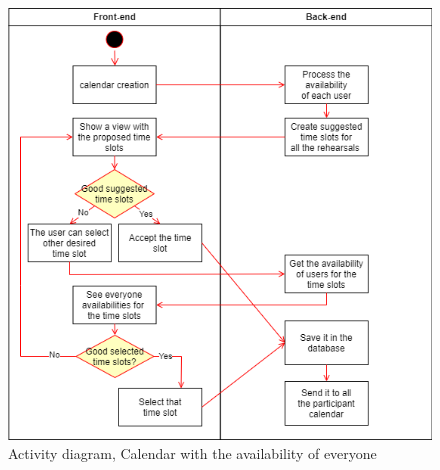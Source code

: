 \documentclass[11pt]{article}
\begin{document}
\begin{figure}[htbp!]
    \centering
    \includegraphics[scale=0.5]{calendarselection.drawio.png}
    \caption{Activity diagram, Calendar with the availability of everyone}
\end{figure}
\end{document}
